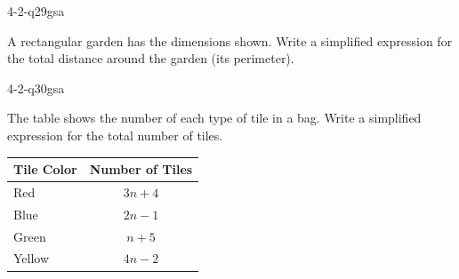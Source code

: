 \begin{practiceQuestion}{4-2-q29}{gsa}
\begin{questionText}
A rectangular garden has the dimensions shown. Write a simplified expression for the total distance around the garden (its perimeter).

\begin{center}
\end{center}
\end{questionText}
\end{practiceQuestion}

\begin{practiceQuestion}{4-2-q30}{gsa}
\begin{questionText}
The table shows the number of each type of tile in a bag. Write a simplified expression for the total number of tiles.

\begin{center}
\begin{tabular}{|l|c|}
\hline
\textbf{Tile Color} & \textbf{Number of Tiles} \\
\hline
Red & $3n + 4$ \\
\hline
Blue & $2n - 1$ \\
\hline
Green & $n + 5$ \\
\hline
Yellow & $4n - 2$ \\
\hline
\end{tabular}
\end{center}
\end{questionText}
\end{practiceQuestion}
